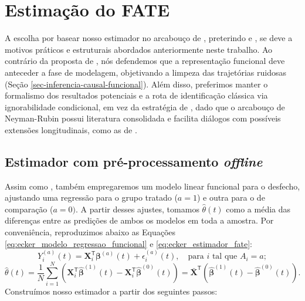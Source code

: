 \section{Estimação do FATE}\label{sec-estimacao-fate}
A escolha por basear nosso estimador no arcabouço de , preterindo  e , se deve a motivos práticos e estruturais abordados anteriormente neste trabalho. 
Ao contrário da proposta de , nós defendemos que a representação funcional deve anteceder a fase de modelagem, objetivando a limpeza das trajetórias ruidosas (Seção \ref{sec-inferencia-causal-funcional}). 
Além disso, preferimos manter o formalismo dos resultados potenciais e a rota de identificação clássica via ignorabilidade condicional, em vez da estratégia de , dado que o arcabouço de Neyman-Rubin possui literatura consolidada e facilita diálogos com possíveis extensões longitudinais, como as de .

\subsection{Estimador com pré-processamento \emph{offline}}\label{sec-estimador-offline}
Assim como , também empregaremos um modelo linear funcional para o desfecho, ajustando uma regressão para o grupo tratado (\(a = 1\)) e outra para o de comparação (\(a = 0)\). 
A partir desses ajustes, tomamos \(\hat{\theta}(t)\) como a média das diferenças entre as predições de ambos os modelos em toda a amostra. 
Por conveniência, reproduzimos abaixo as Equações \ref{eq:ecker_modelo_regressao_funcional} e \ref{eq:ecker_estimador_fate}:
\begin{equation*}
    Y_i^{(a)}(t) = \mathbf{X}_i^{\mathsf{T}}\boldsymbol{\beta}^{(a)}(t) + \epsilon_i^{(a)}(t), \quad \text{para } i \text{ tal que } A_i = a;
\end{equation*}
\begin{equation*}
    \hat{\theta}(t) = \frac{1}{N}\sum\limits_{i = 1}^{N}\left(\mathbf{X}_i^{\mathsf{T}}\hat{\boldsymbol{\beta}}^{(1)}(t) - \mathbf{X}_i^{\mathsf{T}}\hat{\boldsymbol{\beta}}^{(0)}(t)\right)
    = \bar{\mathbf{X}}^{\mathsf{T}}\left(\hat{\boldsymbol{\beta}}^{(1)}(t) - \hat{\boldsymbol{\beta}}^{(0)}(t)\right).
\end{equation*}
Construímos nosso estimador a partir dos seguintes passos:

